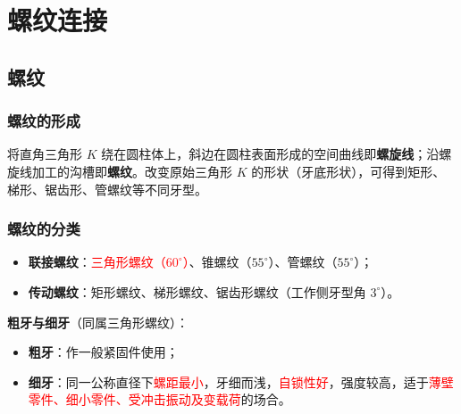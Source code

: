 \chapter{螺纹连接}
\label{chap:螺纹连接}

\section{螺纹}
\label{sec:螺纹}

\subsection{螺纹的形成}

\begin{definition}[螺纹的形成]
\label{def:螺纹形成}
将直角三角形 $K$ 绕在圆柱体上，斜边在圆柱表面形成的空间曲线即\textbf{螺旋线}；沿螺旋线加工的沟槽即\textbf{螺纹}。改变原始三角形 $K$ 的形状（牙底形状），可得到矩形、梯形、锯齿形、管螺纹等不同牙型。
\end{definition}

\subsection{螺纹的分类}

\begin{definition}[按牙型分类]
\label{def:螺纹按牙型分类}
\begin{itemize}
	\item \textbf{联接螺纹}：\textcolor{red}{三角形螺纹（$60^\circ$）}、锥螺纹（$55^\circ$）、管螺纹（$55^\circ$）；
	\item \textbf{传动螺纹}：矩形螺纹、梯形螺纹、锯齿形螺纹（工作侧牙型角 $3^\circ$）。
\end{itemize}

\textbf{粗牙与细牙}（同属三角形螺纹）：
\begin{itemize}
	\item \textbf{粗牙}：作一般紧固件使用；
	\item \textbf{细牙}：同一公称直径下\textcolor{red}{螺距最小}，牙细而浅，\textcolor{red}{自锁性好}，强度较高，适于\textcolor{red}{薄壁零件、细小零件、受冲击振动及变载荷}的场合。
\end{itemize}
\end{definition}

